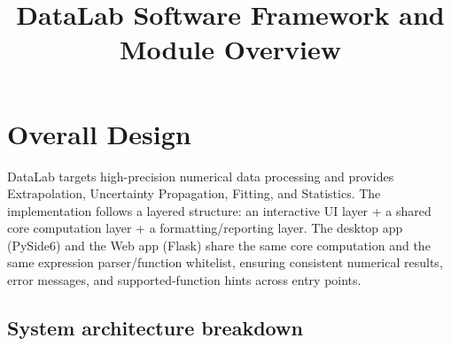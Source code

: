 \documentclass[a4paper,11pt]{article}
\title{DataLab Software Framework and Module Overview}
\author{}
\date{}
\begin{document}
\maketitle

\section{Overall Design}

DataLab targets high-precision numerical data processing and provides Extrapolation, Uncertainty Propagation, Fitting, and Statistics. The implementation follows a layered structure: an interactive UI layer + a shared core computation layer + a formatting/reporting layer. The desktop app (PySide6) and the Web app (Flask) share the same core computation and the same expression parser/function whitelist, ensuring consistent numerical results, error messages, and supported-function hints across entry points.

\subsection{System architecture breakdown}
\end{document}
